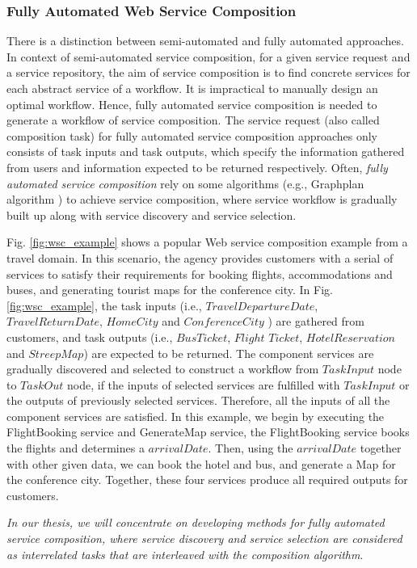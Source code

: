 \subsubsection{Fully Automated Web Service Composition}\label{fully}

There is a distinction between semi-automated and fully automated approaches. In context of semi-automated service composition, for a given service request and a service repository, the aim of service composition is to find concrete services for each abstract service of a workflow. It is impractical to manually design an optimal workflow. Hence, fully automated service composition is needed to generate a workflow of service composition. The service request (also called composition task) for fully automated service composition approaches only consists of task inputs and task outputs, which specify the information gathered from users and information expected to be returned respectively. Often, \emph{fully automated service composition} rely on some algorithms (e.g., Graphplan algorithm \cite{blum1997fast}) to achieve service composition, where service workflow is gradually built up along with service discovery and service selection. 

Fig. \ref{fig:wsc_example} shows a popular Web service composition example from a travel domain. In this scenario, the agency provides customers with a serial of services to satisfy their requirements for booking flights, accommodations and buses, and generating tourist maps for the conference city. In Fig. \ref{fig:wsc_example}, the task inputs (i.e., $TravelDepartureDate$, $TravelReturnDate$, $HomeCity$ and $ConferenceCity$ ) are gathered from customers, and task outputs (i.e., $BusTicket$, $Flight$ $Ticket$, $HotelReservation$ and $StreepMap$) are expected to be returned. The component services are gradually discovered and selected to construct a workflow from $TaskInput$ node to $TaskOut$ node, if the inputs of selected services are fulfilled with $TaskInput$ or the outputs of previously selected services. Therefore, all the inputs of all the component services are satisfied. In this example, we begin by executing the FlightBooking service and GenerateMap service, the FlightBooking service books the flights and determines a $arrivalDate$. Then, using the $arrivalDate$ together with other given data, we can book the hotel and bus, and generate a Map for the conference city. Together, these four services produce all required outputs for customers. 

\emph{In our thesis, we will concentrate on developing methods for fully automated service composition, where service discovery and service selection are considered as interrelated tasks that are interleaved with the composition algorithm}. 

